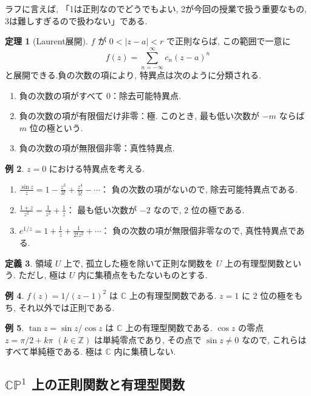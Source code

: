\documentclass[dvipdfmx,a4paper,11pt]{article} %
\newcommand{\Z}{\mathbb{Z}}
\newcommand{\C}{\mathbb{C}}
\theoremstyle{definition}
\newtheorem{thm}{定理}[section]
\numberwithin{equation}{section}
\newtheorem{dfn}[thm]{定義}
\newtheorem{exa}[thm]{例}
\begin{document}
ラフに言えば, 「1は正則なのでどうでもよい, 2が今回の授業で扱う重要なもの, 3は難しすぎるので扱わない」である. 

\begin{thm}[Laurent展開]
$f$ が $0<|z-a|<r$ で正則ならば, この範囲で一意に
\[
f(z)=\sum_{n=-\infty}^{\infty}c_n(z-a)^n
\]
と展開できる.負の次数の項により, 特異点は次のように分類される.
\begin{enumerate}
\item 負の次数の項がすべて $0$：除去可能特異点.
\item 負の次数の項が有限個だけ非零：極.
このとき, 最も低い次数が $-m$ ならば $m$ 位の極という.
\item 負の次数の項が無限個非零：真性特異点.
\end{enumerate}
\end{thm}

\begin{exa}
$z=0$ における特異点を考える.
\begin{enumerate}
\item $\displaystyle \frac{\sin z}{z}
=1-\frac{z^2}{3!}+\frac{z^4}{5!}-\cdots$：
負の次数の項がないので, 除去可能特異点である.
\item $\displaystyle \frac{1+z}{z^2}=\frac{1}{z^2}+\frac{1}{z}$：
最も低い次数が $-2$ なので, $2$ 位の極である.
\item $\displaystyle e^{1/z}
=1+\frac{1}{z}+\frac{1}{2!z^2}+\cdots$：
負の次数の項が無限個非零なので, 真性特異点である.
\end{enumerate}
\end{exa}


\begin{dfn}
領域 $U$ 上で, 孤立した極を除いて正則な関数を
$U$ 上の有理型関数という.
ただし, 極は $U$ 内に集積点をもたないものとする.
\end{dfn}
\begin{exa}
$f(z)=1/(z-1)^2$ は $\C$ 上の有理型関数である.
$z=1$ に $2$ 位の極をもち, それ以外では正則である.
\end{exa}
\begin{exa}
$\tan z=\sin z/\cos z$ は $\C$ 上の有理型関数である.
$\cos z$ の零点 $z=\pi/2+k\pi$ $(k\in\Z)$ は単純零点であり,
その点で $\sin z\neq0$ なので, これらはすべて単純極である.
極は $\C$ 内に集積しない.
\end{exa}


\subsection{$\C\mathbb P^1$ 上の正則関数と有理型関数}\label{O-S011}
\end{document}

